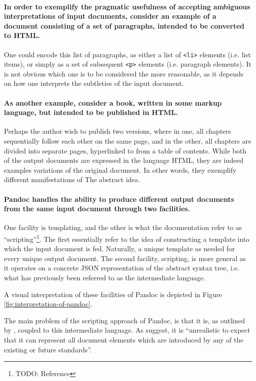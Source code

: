 \documentclass{scrreprt}
\begin{document}
\paragraph{In order to exemplify the pragmatic usefulness of accepting ambiguous interpretations of input documents, consider an example of a document consisting of a set of paragraphs, intended to be converted to HTML.} One could encode this list of paragraphs, as either a list of \texttt{<li>} elements (i.e. list items), or simply as a set of subsequent \texttt{<p>} elements (i.e. paragraph elements). It is not obvious which one is to be considered the more reasonable, as it depends on how one interprets the subtleties of the input document.

\paragraph{As another example, consider a book, written in some markup language, but intended to be published in HTML.} Perhaps the author wish to publish two versions, where in one, all chapters sequentially follow each other on the same page, and in the other, all chapters are divided into separate pages, hyperlinked to from a table of contents. While both of the output documents are expressed in the language HTML, they are indeed examples variations of the original document. In other words, they exemplify different manifestations of The abstract idea.




\paragraph{Pandoc\footnotePandoc{} handles the ability to produce different output documents from the same input document through two facilities.} One facility is templating, and the other is what the documentation refer to as ``scripting''\footnote{TODO: Reference}. The first essentially refer to the idea of constructing a template into which the input document is fed. Naturally, a unique template as needed for every unique output document. The second facility, scripting, is more general as it operates on a concrete JSON representation of the abstract syntax tree, i.e. what has previously been referred to as the intermediate language.

A visual interpretation of these facilities of Pandoc\footnotePandoc{} is depicted in Figure \ref{fig:interpretation-of-pandoc}.

The main problem of the scripting approach of Pandoc\footnotePandoc{}, is that it is, as outlined by \citet{krijnen}, coupled to this intermediate language. As \citet{krijnen} suggest, it is ``unrealistic to expect that it can represent all document elements which are introduced by any of the existing or future standards''.
\end{document}
